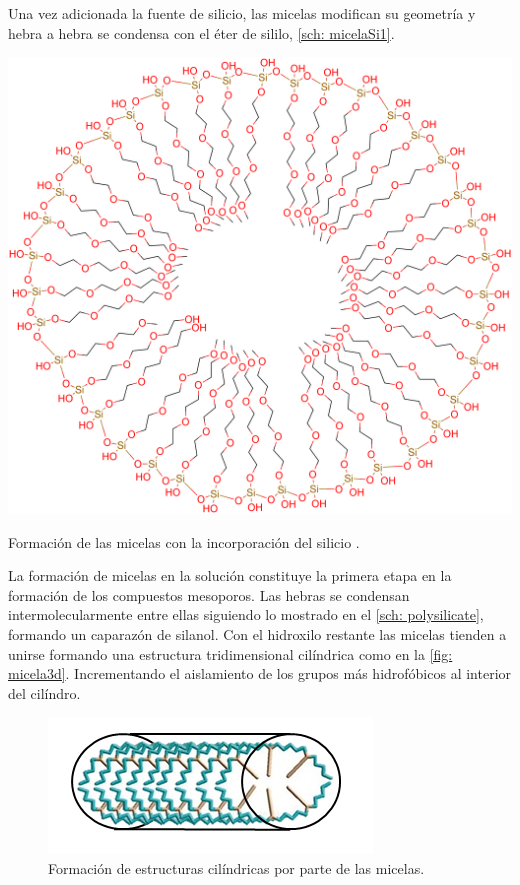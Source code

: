 \documentclass[fleqn, 12pt]{SelfArx}
\begin{document}
Una vez adicionada la fuente de silicio, las micelas modifican su geometr\'ia y hebra a hebra se condensa con el \'eter de sililo, \autoref{sch: micelaSi1}.
\begin{scheme}[h]
	\centering
	\includegraphics[width=0.8\linewidth]{structures/micelaSi2.png}
	\caption{Formaci\'on de las micelas con la incorporaci\'on del silicio \cite{yang_2011}.}
	\label{sch: micelaSi2}
\end{scheme} 

La formaci\'on de micelas en la soluci\'on constituye la primera etapa en la formaci\'on de los compuestos mesoporos. Las hebras se condensan intermolecularmente entre ellas siguiendo lo mostrado en el \autoref{sch: polysilicate}, formando un caparaz\'on de silanol. Con el hidroxilo restante las micelas tienden a unirse formando una estructura tridimensional cil\'indrica como en la \autoref{fig: micela3d}. Incrementando el aislamiento de los grupos m\'as hidrof\'obicos al interior del cil\'indro.
\begin{figure}[h]
	\centering
	\includegraphics[width=0.8\linewidth]{structures/micela3D.png}
	\caption{Formaci\'on de estructuras cil\'indricas por parte de las micelas.}
	\label{fig: micela3d}
\end{figure}
\end{document}
